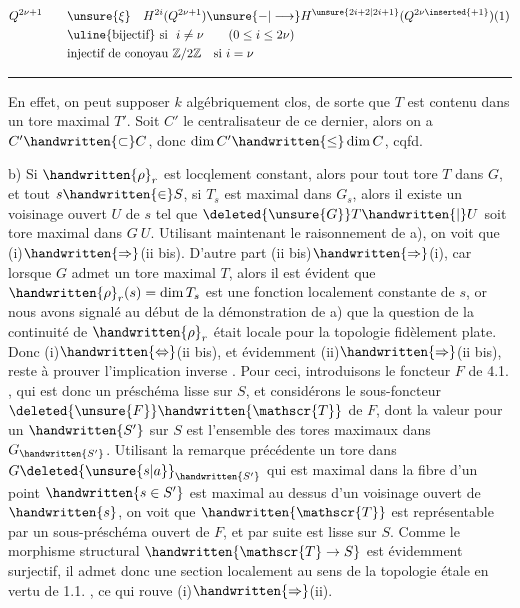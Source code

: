 \[
\begin{aligned}
Q^{2\nu+1}\qquad
&\unsure{\xi}\quad H^{2i}(Q^{2\nu+1})\unsure{-|\longrightarrow}H^{\unsure{2i+2|2i+1}}(Q^{2\nu\inserted{+1}})(1)\\
&\text{\uline{bijectif} si }\ i\ne\nu\qquad (0\leq i\leq2\nu)\\
&\text{injectif de conoyau }\mathbb Z/2\mathbb Z\quad\text{si }i=\nu
\end{aligned}
\]
\noindent\rule{.83\linewidth}{.4pt}
En effet, on peut supposer $k$ algébriquement clos, de sorte que $T$ est contenu dans un tore maximal  $T'$. Soit $C'$ le centralisateur de ce dernier, alors on a $C'\handwritten{\subset}C$, donc $\dim C'\handwritten{\leq}\dim C$, cqfd.

b)  Si $\handwritten{\rho}_{r}$ est locqlement constant, alors pour tout tore $T$ dans $G$,  et tout $s\handwritten{\in}S$, si $T_{s}$ est  maximal dans $G_{s}$, alors il existe un voisinage ouvert $U$ de $s$ tel que $\deleted{\unsure{G}}T\handwritten{\vert}U$ soit tore maximal dans $G\ U$. Utilisant maintenant le raisonnement de a), on voit que  (i)$\handwritten{\Rightarrow}$(ii bis). D'autre part (ii bis)$\handwritten{\Rightarrow}$(i),
car  lorsque $G$ admet un tore maximal $T$, alors il est évident que $\handwritten{\rho}_{r}(s)=\dim T_{s}$ est une fonction localement constante de  $s$, or nous avons signalé au début de la démonstration de a) que la question de la continuité de $\handwritten{\rho}_{r}$ était locale pour la topologie fidèlement plate. Donc (i)$\handwritten{\Leftrightarrow}$(ii bis), et évidemment (ii)$\handwritten{\Rightarrow}$(ii bis), reste à prouver l'implication inverse .
Pour ceci, introduisons le foncteur $F$ de 4.1. , qui est donc un préschéma  lisse  sur $S$, et considérons le sous-foncteur $\deleted{\unsure{F}}\handwritten{\mathscr{T}}$ de $F$, dont la valeur  pour un $\handwritten{S'}$ sur $S$ est l'ensemble des tores maximaux dans $G_{\handwritten{S'}}$. Utilisant la remarque précédente   un tore dans ${G\deleted{\unsure{s|a}}}_{\handwritten{S'}}$ qui est maximal dans la fibre d'un
point $\handwritten{s\in S'}$ est maximal au dessus d'un voisinage ouvert de $\handwritten{s}$, on voit que $\handwritten{\mathscr{T}}$ est représentable par un sous-préschéma ouvert de $F$, et par suite est lisse  sur $S$. Comme le morphisme structural $\handwritten{\mathscr{T}\to S}$ est évidem\deleted{\unsure{-}}ment surjectif, il admet donc  une section localement au sens de la topologie étale en vertu de 1.1. , ce qui rouve (i)$\handwritten{\Rightarrow}$(ii).

